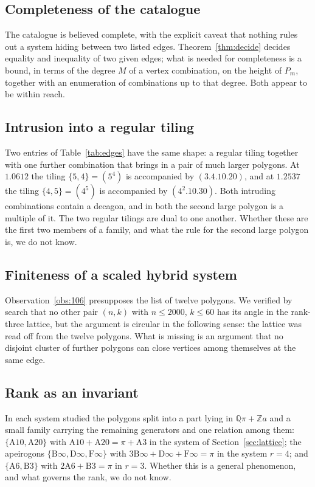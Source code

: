 \documentclass[11pt,a4paper]{article}
\theoremstyle{plain}
\theoremstyle{definition}
\theoremstyle{remark}
\newcommand{\ZZ}{\mathbb{Z}}
\newcommand{\QQ}{\mathbb{Q}}
\newcommand{\vc}[1]{(#1)}
\begin{document}
\subsection*{Completeness of the catalogue}
The catalogue is believed complete, with the explicit caveat that nothing rules
out a system hiding between two listed edges. Theorem~\ref{thm:decide} decides
equality and inequality of two given edges; what is needed for completeness is a
bound, in terms of the degree $M$ of a vertex combination, on the height of
$P_m$, together with an enumeration of combinations up to that degree. Both
appear to be within reach.

\subsection*{Intrusion into a regular tiling}
Two entries of Table~\ref{tab:edges} have the same shape: a regular tiling
together with one further combination that brings in a pair of much larger
polygons. At $1.0612$ the tiling $\{5,4\}=\vc{5^{4}}$ is accompanied by
$\vc{3.4.10.20}$, and at $1.2537$ the tiling $\{4,5\}=\vc{4^{5}}$ is accompanied
by $\vc{4^{2}.10.30}$. Both intruding combinations contain a decagon, and in both
the second large polygon is a multiple of it. The two regular tilings are dual to
one another. Whether these are the first two members of a family, and what the
rule for the second large polygon is, we do not know.

\subsection*{Finiteness of a scaled hybrid system}
Observation~\ref{obs:106} presupposes the list of twelve polygons. We verified by
search that no other pair $(n,k)$ with $n\le2000$, $k\le60$ has its angle in the
rank-three lattice, but the argument is circular in the following sense: the
lattice was read off from the twelve polygons. What is missing is an argument
that no disjoint cluster of further polygons can close vertices among themselves
at the same edge.

\subsection*{Rank as an invariant}
In each system studied the polygons split into a part lying in
$\QQ\pi+\ZZ a$ and a small family carrying the remaining generators and one
relation among them: $\{\mathrm{A}10,\mathrm{A}20\}$ with
$\mathrm{A}10+\mathrm{A}20=\pi+\mathrm{A}3$ in the system of
Section~\ref{sec:lattice}; the apeirogons
$\{\mathrm{B}\infty,\mathrm{D}\infty,\mathrm{F}\infty\}$
with $3\mathrm{B}\infty+\mathrm{D}\infty+\mathrm{F}\infty=\pi$ in the system
$r=4$; and $\{\mathrm{A}6,\mathrm{B}3\}$ with $2\mathrm{A}6+\mathrm{B}3=\pi$ in
$r=3$. Whether this is a general phenomenon, and what governs the rank, we do not
know.
\end{document}
